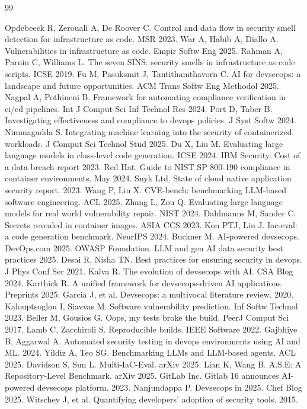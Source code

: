 \documentclass[
  journal=largetwo,
  manuscript=article-type,
  year=2025,
  volume=1,
]{cup-journal}
\begin{document}
\begin{thebibliography}{99}

 Opdebeeck R, Zerouali A, De Roover C. Control and data flow in security smell detection for infrastructure as code. MSR 2023.
 War A, Habib A, Diallo A. Vulnerabilities in infrastructure as code. Empir Softw Eng 2025.
 Rahman A, Parnin C, Williams L. The seven SINS: security smells in infrastructure as code scripts. ICSE 2019.
 Fu M, Pasuksmit J, Tantithamthavorn C. AI for devsecops: a landscape and future opportunities. ACM Trans Softw Eng Methodol 2025.
 Nagpal A, Pothineni B. Framework for automating compliance verification in ci/cd pipelines. Int J Comput Sci Inf Technol Res 2024.
 Port D, Taber B. Investigating effectiveness and compliance to devops policies. J Syst Softw 2024.
 Nimmagadda S. Integrating machine learning into the security of containerized workloads. J Comput Sci Technol Stud 2025.
 Du X, Liu M. Evaluating large language models in class-level code generation. ICSE 2024.
 IBM Security. Cost of a data breach report 2023.
 Red Hat. Guide to NIST SP 800-190 compliance in container environments. May 2024.
 Snyk Ltd. State of cloud native application security report. 2023.
 Wang P, Liu X. CVE-bench: benchmarking LLM-based software engineering. ACL 2025.
 Zhang L, Zou Q. Evaluating large language models for real world vulnerability repair. NIST 2024.
 Dahlmanns M, Sander C. Secrets revealed in container images. ASIA CCS 2023.
 Kon PTJ, Liu J. Iac-eval: a code generation benchmark. NeurIPS 2024.
 Buckner M. AI-powered devsecops. DevOps.com 2025.
 OWASP Foundation. LLM and gen AI data security best practices 2025.
 Desai R, Nisha TN. Best practices for ensuring security in devops. J Phys Conf Ser 2021.
 Kalva R. The evolution of devsecops with AI. CSA Blog 2024.
 Karthick R. A unified framework for devsecops-driven AI applications. Preprints 2025.
 Garcia J, et al. Devsecops: a multivocal literature review. 2020.
 Kalouptsoglou I, Siavvas M. Software vulnerability prediction. Inf Softw Technol 2023.
 Beller M, Gousios G. Oops, my tests broke the build. PeerJ Comput Sci 2017.
 Lamb C, Zacchiroli S. Reproducible builds. IEEE Software 2022.
 Gajbhiye B, Aggarwal A. Automated security testing in devops environments using AI and ML. 2024.
 Yildiz A, Teo SG. Benchmarking LLMs and LLM-based agents. ACL 2025.
 Davidson S, Sun L. Multi-IaC-Eval. arXiv 2025.
 Lian K, Wang B. A.S.E: A Repository-Level Benchmark. arXiv 2025.
 GitLab Inc. Gitlab 16 announces AI-powered devsecops platform. 2023.
 Nanjundappa P. Devsecops in 2025. Chef Blog 2025.
 Witschey J, et al. Quantifying developers’ adoption of security tools. 2015.

\end{thebibliography}
\end{document}
